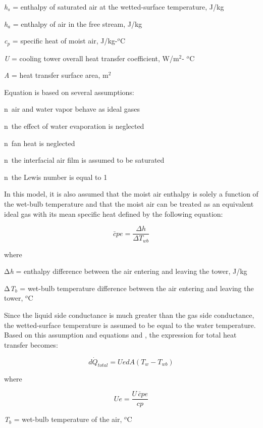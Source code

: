 \emph{h\(_{s}\)} = enthalpy of saturated air at the wetted-surface temperature, J/kg

\emph{h\(_{a}\)} = enthalpy of air in the free stream, J/kg

\emph{c\(_{p}\)} = specific heat of moist air, J/kg-\(^{o}\)C

\emph{U} = cooling tower overall heat transfer coefficient, W/m\(^{2}\)- \(^{o}\)C

\emph{A} = heat transfer surface area, m\(^{2}\)

Equation is based on several assumptions:

n~air and water vapor behave as ideal gases

n~the effect of water evaporation is neglected

n~fan heat is neglected

n~the interfacial air film is assumed to be saturated

n~the Lewis number is equal to 1

In this model, it is also assumed that the moist air enthalpy is solely a function of the wet-bulb temperature and that the moist air can be treated as an equivalent ideal gas with its mean specific heat defined by the following equation:

\begin{equation}
\bar cpe = \frac{{\Delta h}}{{\Delta {T_{wb}}}}
\end{equation}

where

Δ\emph{h} = enthalpy difference between the air entering and leaving the tower, J/kg

Δ\emph{T\(_{b}\)} = wet-bulb temperature difference between the air entering and leaving the tower, \(^{o}\)C

Since the liquid side conductance is much greater than the gas side conductance, the wetted-surface temperature is assumed to be equal to the water temperature. Based on this assumption and equations and , the expression for total heat transfer becomes:

\begin{equation}
d{\dot Q_{total}} = UedA\left( {{T_w} - {T_{wb}}} \right)
\end{equation}

where

\begin{equation}
Ue = \frac{{U\,\bar cpe}}{{cp}}
\end{equation}

\emph{T\(_{b}\)} = wet-bulb temperature of the air, \(^{o}\)C

